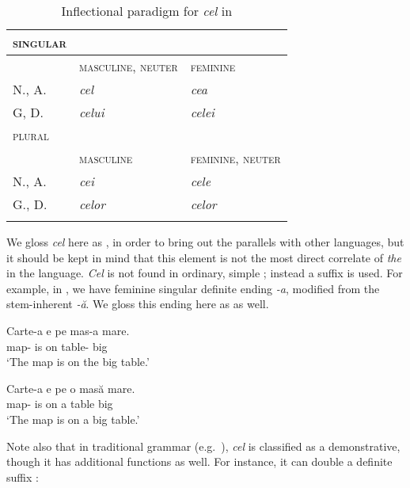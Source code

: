 \documentclass[output=paper
,modfonts
,nonflat]{langsci/langscibook}
\begin{document}
\begin{table}[bh]
\caption{Inflectional paradigm for \textit{cel} in }
\label{tab:coppockstrand:3}
\begin{tabularx}{0.75\textwidth}{ l X X }
\lsptoprule
\textsc{singular}\\\midrule
& \textsc{masculine}, \textsc{neuter} & \textsc{feminine}\\\midrule
N., A. & \textit{cel} & \textit{cea}\\
G, D. & \textit{celui} & \textit{celei}\\\midrule
\textsc{plural}\\\midrule
& \textsc{masculine} & \textsc{feminine}, \textsc{neuter}\\\midrule
N., A. & \textit{cei} & \textit{cele}\\
G., D. & \textit{celor} & \textit{celor}\\\lspbottomrule
\end{tabularx}
\end{table}


We gloss \textit{cel} here as , in order to bring out the parallels with other  languages, but it should be kept in mind that this element is not the most direct correlate of  \textit{the} in the language. 
\textit{Cel} is not found in ordinary, simple ; instead a suffix is used. For example, in , we have feminine singular definite ending \textit{-a}, modified from the stem-inherent \textit{-ă}. We gloss this ending here as  as well.

\ea \label{ex:coppockstrand:30}
\begin{xlist}
\ex \label{ex:coppockstrand:30a}
\gll Carte-a e pe mas-a mare.\\
map- is on table- big\\
\glt `The map is on the big table.'

\ex \label{ex:coppockstrand:30b}
\gll Carte-a e pe o masă mare.\\
map- is on a table big\\
\glt `The map is on a big table.'
\end{xlist}
\z

Note also that in traditional grammar (e.g.\ \citealt{Cojocaru2003}), \textit{cel} is classified as a demonstrative, though it has additional functions as well. For instance, it can double a definite suffix \citep{Alexiadou2014}:
\end{document}
